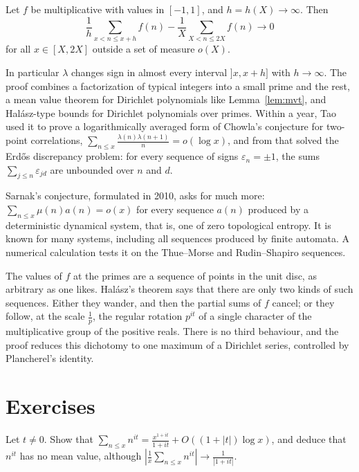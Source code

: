 \begin{theorem}\label{thm:mr}
Let $f$ be multiplicative with values in $[-1,1]$, and $h=h(X)\to\infty$. Then
\[
\frac1h\sum_{x<n\le x+h}f(n)-\frac1X\sum_{X<n\le2X}f(n)\longrightarrow0
\]
for all $x\in[X,2X]$ outside a set of measure $o(X)$.
\end{theorem}

In particular $\lambda$ changes sign in almost every interval $]x,x+h]$ with $h\to\infty$. The proof combines a factorization of typical integers into a small prime and the rest, a mean value theorem for Dirichlet polynomials like Lemma~\ref{lem:mvt}, and Halász-type bounds for Dirichlet polynomials over primes. Within a year, Tao used it to prove a logarithmically averaged form of Chowla's conjecture for two-point correlations, $\sum_{n\le x}\frac{\lambda(n)\lambda(n+1)}n=o(\log x)$, and from that solved the Erdős discrepancy problem: for every sequence of signs $\varepsilon_n=\pm1$, the sums $\sum_{j\le n}\varepsilon_{jd}$ are unbounded over $n$ and $d$.

Sarnak's conjecture, formulated in 2010, asks for much more: $\sum_{n\le x}\mu(n)a(n)=o(x)$ for every sequence $a(n)$ produced by a deterministic dynamical system, that is, one of zero topological entropy. It is known for many systems, including all sequences produced by finite automata. A numerical calculation tests it on the Thue--Morse and Rudin--Shapiro sequences.

\begin{beauty}
The values of $f$ at the primes are a sequence of points in the unit disc, as arbitrary as one likes. Halász's theorem says that there are only two kinds of such sequences. Either they wander, and then the partial sums of $f$ cancel; or they follow, at the scale $\frac1p$, the regular rotation $p^{it}$ of a single character of the multiplicative group of the positive reals. There is no third behaviour, and the proof reduces this dichotomy to one maximum of a Dirichlet series, controlled by Plancherel's identity.
\end{beauty}

\section{Exercises}

\begin{exercise}[$\star$]\label{ex:nit}
Let $t\ne0$. Show that $\sum_{n\le x}n^{it}=\frac{x^{1+it}}{1+it}+O((1+|t|)\log x)$, and deduce that $n^{it}$ has no mean value, although $|\frac1x\sum_{n\le x}n^{it}|\to\frac1{|1+it|}$.
\end{exercise}

